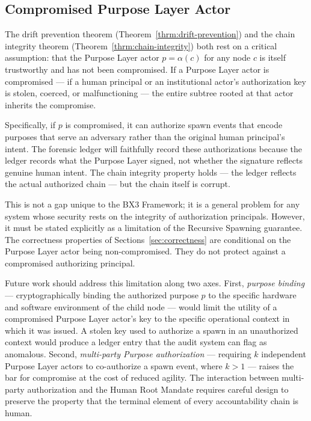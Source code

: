 \subsection{Compromised Purpose Layer Actor}
\label{sec:limitations-purpose-compromise}

The drift prevention theorem (Theorem~\ref{thrm:drift-prevention}) and the chain integrity theorem (Theorem~\ref{thrm:chain-integrity}) both rest on a critical assumption: that the Purpose Layer actor $p = \alpha(c)$ for any node $c$ is itself trustworthy and has not been compromised. If a Purpose Layer actor is compromised — if a human principal or an institutional actor's authorization key is stolen, coerced, or malfunctioning — the entire subtree rooted at that actor inherits the compromise.

Specifically, if $p$ is compromised, it can authorize spawn events that encode purposes that serve an adversary rather than the original human principal's intent. The forensic ledger will faithfully record these authorizations because the ledger records what the Purpose Layer signed, not whether the signature reflects genuine human intent. The chain integrity property holds — the ledger reflects the actual authorized chain — but the chain itself is corrupt.

This is not a gap unique to the BX3 Framework; it is a general problem for any system whose security rests on the integrity of authorization principals. However, it must be stated explicitly as a limitation of the Recursive Spawning guarantee. The correctness properties of Sections~\ref{sec:correctness} are conditional on the Purpose Layer actor being non-compromised. They do not protect against a compromised authorizing principal.

Future work should address this limitation along two axes. First, \textit{purpose binding} — cryptographically binding the authorized purpose $p$ to the specific hardware and software environment of the child node — would limit the utility of a compromised Purpose Layer actor's key to the specific operational context in which it was issued. A stolen key used to authorize a spawn in an unauthorized context would produce a ledger entry that the audit system can flag as anomalous. Second, \textit{multi-party Purpose authorization} — requiring $k$ independent Purpose Layer actors to co-authorize a spawn event, where $k > 1$ — raises the bar for compromise at the cost of reduced agility. The interaction between multi-party authorization and the Human Root Mandate requires careful design to preserve the property that the terminal element of every accountability chain is human.

